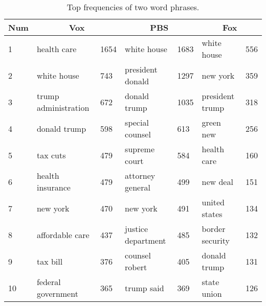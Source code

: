 \begin{table}[H]
    \centering
    \begin{tabular}{|l|ll|ll|ll|}
    \hline
    Num & \multicolumn{2}{c|}{Vox}           & \multicolumn{2}{c|}{PBS}          & \multicolumn{2}{c|}{Fox} \\ \hline \hline
    1   & health care          & 1654 & white house        & 1683 & white house     & 556 \\
    2   & white house          & 743  & president donald   & 1297 & new york        & 359 \\
    3   & trump administration & 672  & donald trump       & 1035 & president trump & 318 \\
    4   & donald trump         & 598  & special counsel    & 613  & green new       & 256 \\
    5   & tax cuts             & 479  & supreme court      & 584  & health care     & 160 \\
    6   & health insurance     & 479  & attorney general   & 499  & new deal        & 151 \\
    7   & new york             & 470  & new york           & 491  & united states   & 134 \\
    8   & affordable care      & 437  & justice department & 485  & border security & 132 \\
    9   & tax bill             & 376  & counsel robert     & 405  & donald trump    & 131 \\
    10  & federal government   & 365  & trump said         & 369  & state union     & 126 \\ \hline
    \end{tabular}
    \caption{Top frequencies of two word phrases.}
    \label{tab:2gram}
\end{table}